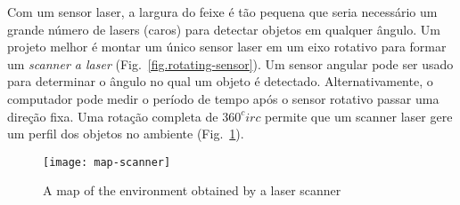 
Com um sensor laser, a largura do feixe é tão pequena que seria necessário um grande número de lasers (caros) para detectar objetos em qualquer ângulo. Um projeto melhor é montar um único sensor laser em um eixo rotativo para formar um \emph{scanner a laser} (Fig.~\ref{fig.rotating-sensor}). Um sensor angular pode ser usado para determinar o ângulo no qual um objeto é detectado. Alternativamente, o computador pode medir o período de tempo após o sensor rotativo passar uma direção fixa. Uma rotação completa de $360^circ{}$ permite que um scanner laser gere um perfil dos objetos no ambiente (Fig.~\ref{fig.laser-scanner}).

\begin{figure}
\begin{center}
\texttt{[image: map-scanner]}
\end{center}
\caption{A map of the environment obtained by a laser scanner}\label{fig.laser-scanner}
\end{figure}

